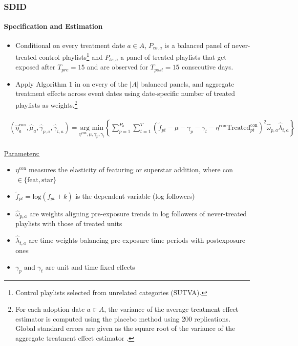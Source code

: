 \documentclass[8pt]{beamer}
\begin{document}


\begin{frame}[label=shortversion]

    \frametitle{SDID}
    \framesubtitle{Specification and Estimation}
    
    \begin{itemize}
        \item Conditional on every treatment date $a \in A$, $P_{co,a}$ is a balanced panel of never-treated control playlists\footnote{Control playlists selected from unrelated categories (SUTVA).} and $P_{tr,a}$ a panel of treated playlists that get exposed after $T_{pre} = 15$ and are observed for $T_{post} = 15$ consecutive days.%
        \item Apply Algorithm 1 in \cite{SDiD_AER_Arkhangelsky_21} on every of the $|A|$ balanced panels, and aggregate treatment effects across event dates using date-specific number of treated playlists as weights.\footnote{For each adoption date $a \in A$, the variance of the average treatment effect estimator is computed using the placebo method \citep[Algorithm 4 in][]{SDiD_AER_Arkhangelsky_21} using 200 replications. Global standard errors are given as the square root of the variance of the aggregate treatment effect estimator \citep[e.g.,][]{Imbens_JoEconmetrics_22}.}
    \end{itemize}
    
    \begin{align} 
        \begin{split}
        \left(\hat{\eta}_a^{\text{con}}, \hat{\mu}_a, \hat{\gamma}_{p,a}, \hat{\gamma}_{t,a}\right) = \underset{\eta^{\text{con}},\mu, \gamma_{p}, \gamma_{t}}{\text{arg min}} \left\{\sum_{p=1}^{P_a} \sum_{t=1}^T \left( \tilde{f}_{pt} - \mu - \gamma_{p} - \gamma_{t} - \eta^{\text{con}} \text{Treated}_{pt}^{\text{con}} \right)^2 \hat{\omega}_{p,a} \hat{\lambda}_{t,a} \right\}
    \end{split}
    \end{align} 

    \vspace{-.3cm}
    \underline{Parameters:}
    \begin{itemize}
        \item $\eta^{\text{con}}$ measures the elasticity of featuring or superstar addition, where con $\in \{\text{feat},\text{star}\}$
        \item $\tilde{f}_{pt} = \text{log}(f_{pt}+k)$ is the dependent variable (log followers)
        \item $\hat{\omega}_{p,a}$ are weights aligning pre-exposure trends in log followers of never-treated playlists with those of treated units
        \item $\hat{\lambda}_{t,a}$ are time weights balancing pre-exposure time periods with postexposure ones
        \item $\gamma_{p}$ and $\gamma_{t}$ are unit and time fixed effects
    \end{itemize}

   
\end{frame}
\end{document}
